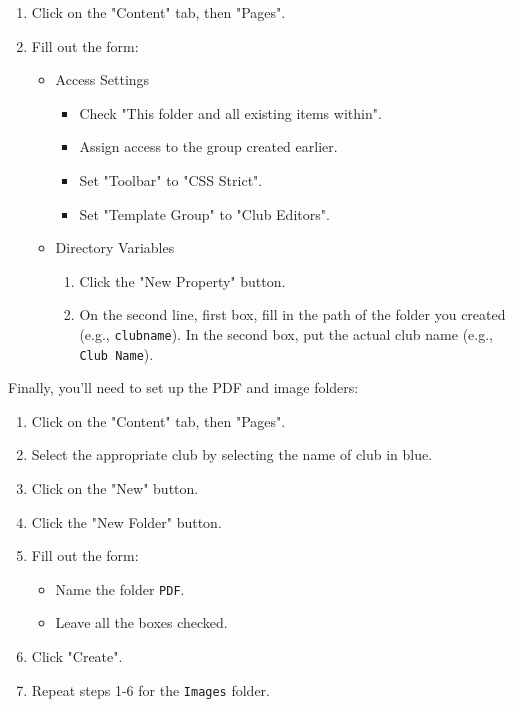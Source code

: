 \documentclass[11pt]{report}
\begin{document}
				\begin{enumerate}
					\item{Click on the "Content" tab, then "Pages".}
					\item{
						Fill out the form:
						\begin{itemize}
							\item{
								Access Settings
								\begin{itemize}
									\item{Check "This folder and all existing items within"}.
									\item{Assign access to the group created earlier.}
									\item{Set "Toolbar" to "CSS Strict".}
									\item{Set "Template Group" to "Club Editors".}
								\end{itemize}
							}
							\item{
								Directory Variables
								\begin{enumerate}
									\item{Click the "New Property" button.}
									\item{On the second line, first box, fill in the path of the folder you created (e.g., \texttt{clubname}). In the second box, put the actual club name (e.g., \texttt{Club Name}).}
								\end{enumerate}
							}
						\end{itemize}
					}
				\end{enumerate}

				Finally, you'll need to set up the PDF and image folders:
				
				\begin{enumerate}
					\item{Click on the "Content" tab, then "Pages".}
					\item{Select the appropriate club by selecting the name of club in blue.}
					\item{Click on the "New" button.}
					\item{Click the "New Folder" button.}
					\item{
						Fill out the form:
						\begin{itemize}
							\item{Name the folder \texttt{PDF}.}
							\item{Leave all the boxes checked.}
						\end{itemize}
					}
					\item{Click "Create".}
					\item{Repeat steps 1-6 for the \texttt{Images} folder.}
				\end{enumerate}
\end{document}
